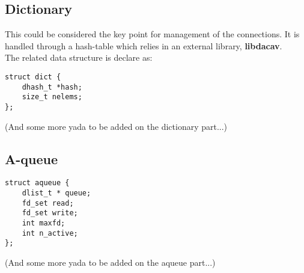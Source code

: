 \subsection{Dictionary}
This could be considered the key point for management of the connections. It is handled through a hash-table
which relies in an external library, \textbf{libdacav}.\\
The related data structure is declare as:
\begin{lstlisting}
struct dict {
    dhash_t *hash;
    size_t nelems;
};
\end{lstlisting}
(And some more yada to be added on the dictionary part...)

\subsection{A-queue}

\begin{lstlisting}
struct aqueue {
    dlist_t * queue;
    fd_set read;
    fd_set write;
    int maxfd;
    int n_active;
};
\end{lstlisting}
(And some more yada to be added on the aqueue part...)
